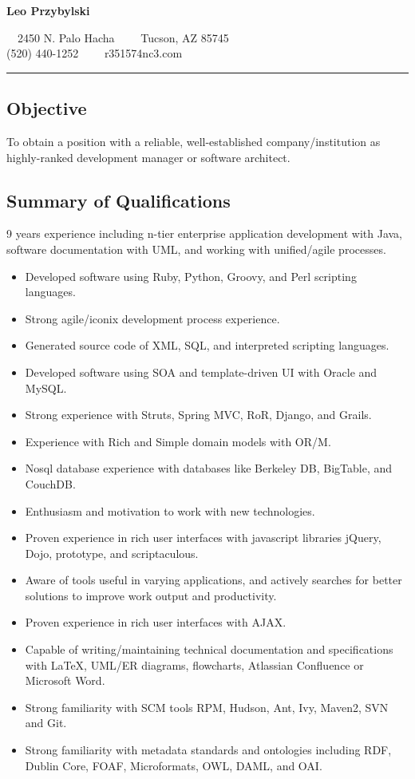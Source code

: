 \documentclass[10pt,letterpaper]{article}
\begin{document}
\begin{center}
  {\LARGE \textbf{Leo Przybylski}}

  \ \ 2450 N. Palo Hacha\ \ \textbullet
  \ \ Tucson, AZ 85745
  \\
  (520) 440-1252\ \ \textbullet
  \ \ r351574nc3\@gmail.com
\end{center}

\hrule
\vspace{-0.4em}
\subsection*{Objective}
To obtain a position with a reliable, well-established
company/institution as highly-ranked development manager or software
architect.

\subsection*{Summary of Qualifications}
9 years experience including n-tier enterprise application development with Java, software 
documentation with UML, and working with unified/agile processes. 
\begin{itemize}
\item Developed software using Ruby, Python, Groovy, and Perl scripting languages.
\item Strong agile/iconix development process experience.
\item Generated source code of XML, SQL, and interpreted scripting languages.
\item Developed software using SOA and template-driven UI with Oracle and MySQL.
\item Strong experience with Struts, Spring MVC, RoR, Django, and Grails.
\item Experience with Rich and Simple domain models with OR/M.
\item Nosql database experience with databases like Berkeley DB, BigTable, and CouchDB.
\item Enthusiasm and motivation to work with new technologies.
\item Proven experience in rich user interfaces with javascript libraries jQuery, Dojo, 
  prototype, and scriptaculous.
\item Aware of tools useful in varying applications, and actively
  searches for better solutions to improve work output and productivity.
\item Proven experience in rich user interfaces with AJAX.
\item Capable of writing/maintaining technical documentation and
  specifications with LaTeX, UML/ER diagrams, flowcharts, Atlassian Confluence or Microsoft Word.
\item Strong familiarity with SCM tools RPM, Hudson, Ant, Ivy, Maven2, SVN and Git.
\item Strong familiarity with metadata standards and ontologies
  including RDF, Dublin Core, FOAF, Microformats, OWL, DAML, and OAI.
\end{itemize}
\end{document}
